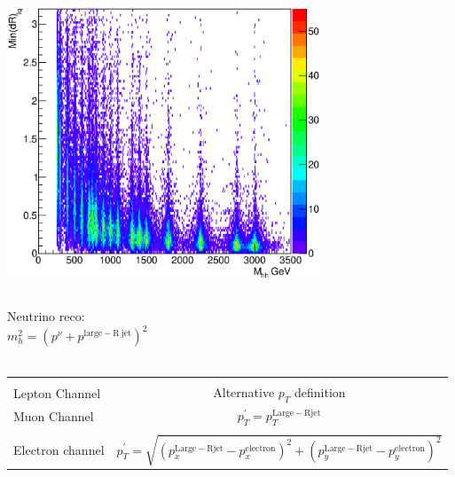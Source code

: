 \documentclass{beamer}
\newcommand*{\header}[1]{\fontsize{16}{8}\selectfont \textbf{{\color{MyPurple}{#1}}}}
\begin{document}
\begin{frame}
\begin{columns}
\begin{column}{0.5\textwidth}
\begin{center}
\includegraphics[width=0.7\textwidth]{figures/drminlq}
\end{center}
\end{column}
\end{columns}
\end{frame}


\begin{frame}
\begin{center}
\header{Kinematic Variable Definition}
\end{center}
\begin{center}
Neutrino reco:\\
$m_h^2 = (p^{\nu} + p^{\mathrm{large-R\ jet}})^2$\\~\\
\begin{table}
\tiny
\begin{tabular}{l|c}
\hline
\\
Lepton Channel & Alternative $p_T$ definition \\
\hline
Muon Channel & ${p_T^{'} = p_T^{\mathrm{Large-R jet}}}$\\
\hline
\\
Electron channel & ${p_T^{'} = \sqrt{(p_{x}^{\mathrm{Large-R jet}} - p_{x}^{\mathrm{electron}})^{2}+(p_{y}^{\mathrm{Large-R jet}} - p_{y}^{\mathrm{electron}})^{2}}}$
\end{tabular}
\end{table}
\end{center}
\end{frame}
\end{document}
